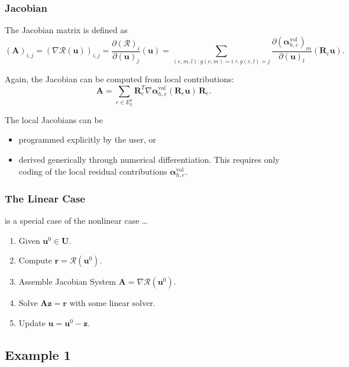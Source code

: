 \begin{frame}
\frametitle{Jacobian}
The Jacobian matrix is defined as
\begin{equation*}
(\mathbf{A})_{i,j} = (\nabla\mathcal{R}(\mathbf{u}))_{i,j}
= \frac{\partial (\mathcal{R})_i}{\partial (\mathbf{u})_j}(\mathbf{u})
= \sum_{(e,m,l) : g(e,m)=i \wedge g(e,l)=j} \frac{\partial (\bm{\alpha}_{h,e}^{\text{vol}})_m }{\partial (\mathbf{u})_l } (\mathbf{R}_e \mathbf{u}).
\end{equation*}

Again, the Jacobian can be computed from local contributions:
\begin{equation*}
\mathbf{A} = \sum_{e\in E_h^0} \mathbf{R}_e^T \nabla\bm{\alpha}_{h,e}^{\text{vol}}(\mathbf{R}_e \mathbf{u}) \, \mathbf{R}_e.
\end{equation*}

The local Jacobians can be
\begin{itemize}
\item programmed explicitly by the user, or
\item derived generically through numerical differentiation. This requires only coding
of the local residual contributions $\bm{\alpha}_{h,e}^{\text{vol}}$.
\end{itemize}
\end{frame}


\begin{frame}
\frametitle{The Linear Case}
is a special case of the nonlinear case \ldots
\begin{enumerate}
\item Given $\mathbf{u}^0\in\mathbf{U}$.
\item Compute $\mathbf{r} = \mathcal{R}(\mathbf{u}^0)$.
\item Assemble Jacobian System $\mathbf{A} = \nabla\mathcal{R}(\mathbf{u}^0)$.
\item Solve $\mathbf{A} \mathbf{z} = \mathbf{r}$ with some linear solver.
\item Update $\mathbf{u} = \mathbf{u}^{0} - \mathbf{z}$.
\end{enumerate}
\end{frame}

\subsection{Example 1}

